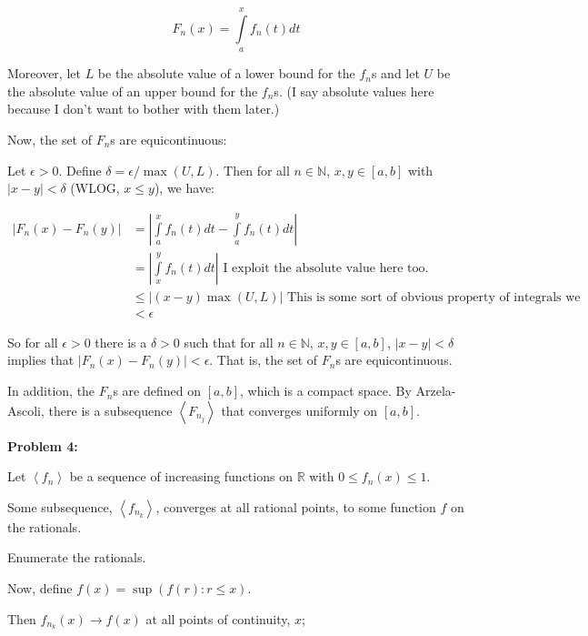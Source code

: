 \documentclass[a4paper,12pt]{article}
\newcommand{\tab}{\hspace{4mm}} %
\newcommand{\shunt}{\vspace{20mm}}
\newcommand{\absval}[1]{\left\lvert #1 \right\rvert}
\newcommand{\anbrack}[1]{\left\langle #1 \right\rangle}
\newcommand{\de}{\delta}
\newcommand{\ep}{\epsilon}
\newcommand{\N}{\mathbb{N}}
\newcommand{\R}{\mathbb{R}}
\begin{document}
\begin{displaymath}
F_n(x) = \int\limits_a^x f_n(t)dt
\end{displaymath}

Moreover, let $L$ be the absolute value of a lower bound for the $f_n$s and let $U$ be the absolute value of an upper bound for the $f_n$s. (I say absolute values here because I don't want to bother with them later.)

Now, the set of $F_n$s are equicontinuous:

\tab Let $\ep >0$. Define $\de = \ep /\max(U,L)$. Then for all $n \in \N$, $x, y \in [a,b]$ with $\absval{x-y} < \de$ (WLOG, $x \leq y$), we have:

\begin{align*}
\absval{F_n(x)-F_n(y)} &= \absval{\int\limits_a^x f_n(t)dt - \int\limits_a^y f_n(t)dt} \\
&= \absval{\int\limits_x^y f_n(t)dt} \text{ I exploit the absolute value here too.} \\
&\leq \absval{(x-y)\max(U,L)} \text{ This is some sort of obvious property of integrals we should know} \\
&< \ep
\end{align*}

\tab So for all $\ep>0$ there is a $\de >0$ such that for all $n \in \N$, $x,y \in [a,b]$, $\absval{x-y} < \de$ implies that $\absval{F_n(x)-F_n(y)} < \ep$. That is, the set of $F_n$s are equicontinuous.

In addition, the $F_n$s are defined on $[a,b]$, which is a compact space. By Arzela-Ascoli, there is a subsequence $\anbrack{F_{n_j}}$ that converges uniformly on $[a,b]$.

\shunt

{\bf Problem 4:}

Let $\anbrack{f_n}$ be a sequence of increasing functions on $\R$ with $0 \leq f_n(x) \leq 1$. 

Some subsequence, $\anbrack{f_{n_k}}$, converges at all rational points, to some function $f$ on the rationals.

\tab Enumerate the rationals.


Now, define $f(x) = \sup(f(r): r \leq x)$.

Then $f_{n_k}(x) \to f(x)$ at all points of continuity, $x$;
\end{document}
